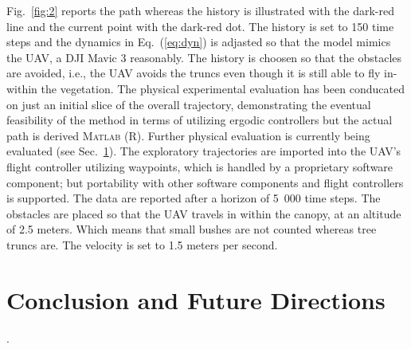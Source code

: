 \documentclass[letterpaper,10pt,conference,twoside]{IEEEtran}
\theoremstyle{definition}
\begin{document}
Fig.~\ref{fig:2} reports the path whereas the history is illustrated with the dark-red line and the current point with the dark-red dot. The history is set to 150 time steps and the dynamics in Eq.~(\ref{eq:dyn}) is adjasted so that the model mimics the UAV, a DJI Mavic 3 reasonably. The history is choosen so that the obstacles are avoided, i.e., the UAV avoids the truncs even though it is still able to fly in-within the vegetation. The physical experimental evaluation has been conducated on just an initial slice of the overall trajectory, demonstrating the eventual feasibility of the method in terms of utilizing ergodic controllers but the actual path is derived \textsc{Matlab} (R). Further physical evaluation is currently being evaluated (see Sec.~\ref{sec:conc}). The exploratory trajectories are imported into the UAV's flight controller utilizing waypoints, which is handled by a proprietary software component; but portability with other software components and flight controllers is supported. 
The data are reported after a horizon of 5~000 time steps. The obstacles are placed so that the UAV travels in within the canopy, at an altitude of 2.5 meters. Which means that small bushes are not counted whereas tree truncs are. The velocity is set to 1.5 meters per second.

\section{Conclusion and Future Directions}\label{sec:conc}
\noindent
.

~
\newpage

{\small
 

}
\end{document}
